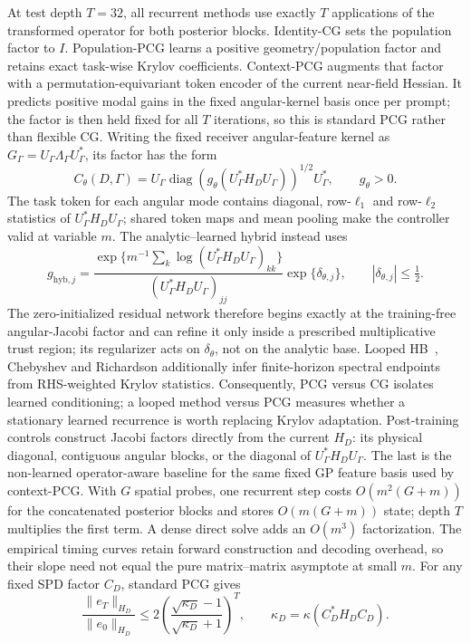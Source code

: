 \documentclass[10pt]{article}
\begin{document}
At test depth $T=32$, all recurrent methods use exactly
$T$ applications of the transformed operator for both posterior blocks.
Identity-CG sets the population factor to $I$.  Population-PCG learns a positive
geometry/population factor and retains exact task-wise Krylov coefficients.
Context-PCG augments that factor with a permutation-equivariant token encoder
of the current near-field Hessian.  It predicts positive modal gains in the
fixed angular-kernel basis once per prompt; the factor is then held fixed for
all $T$ iterations, so this is standard PCG rather than flexible CG.  Writing
the fixed receiver angular-feature kernel as
$G_\Gamma=U_\Gamma\Lambda_\Gamma U_\Gamma^*$, its factor has the form
\[
 C_\theta(D,\Gamma)=U_\Gamma
 \operatorname{diag}\!\left(g_\theta(
 U_\Gamma^*H_DU_\Gamma)\right)^{1/2}U_\Gamma^*,
 \qquad g_\theta>0.
\]
The task token for each angular mode contains diagonal, row-$\ell_1$ and
row-$\ell_2$ statistics of $U_\Gamma^*H_DU_\Gamma$; shared token maps and mean
pooling make the controller valid at variable $m$.
The analytic--learned hybrid instead uses
\[
 g_{\mathrm{hyb},j}=\frac{
 \exp\{m^{-1}\sum_k\log (U_\Gamma^*H_DU_\Gamma)_{kk}\}
 }{(U_\Gamma^*H_DU_\Gamma)_{jj}}
 \exp\{\delta_{\theta,j}\},\qquad |\delta_{\theta,j}|\leq\tfrac12 .
\]
The zero-initialized residual network therefore begins exactly at the
training-free angular-Jacobi factor and can refine it only inside a prescribed
multiplicative trust region; its regularizer acts on $\delta_\theta$, not on the
analytic base.
Looped HB~\cite{polyak1964}, Chebyshev and Richardson additionally infer
finite-horizon spectral
endpoints from RHS-weighted Krylov statistics.  Consequently, PCG versus CG
isolates learned conditioning; a looped method versus PCG measures whether a
stationary learned recurrence is worth replacing Krylov adaptation.
Post-training controls construct Jacobi factors directly from the current
$H_D$: its physical diagonal, contiguous angular blocks, or the diagonal of
$U_\Gamma^*H_DU_\Gamma$.  The last is the non-learned operator-aware baseline
for the same fixed GP feature basis used by context-PCG.
With $G$ spatial probes, one recurrent step costs
$O(m^2(G+m))$ for the concatenated posterior blocks and stores
$O(m(G+m))$ state; depth $T$ multiplies the first term.  A dense direct solve
adds an $O(m^3)$ factorization.  The empirical timing curves retain forward
construction and decoding overhead, so their slope need not equal the pure
matrix--matrix asymptote at small $m$.
For any fixed SPD factor $C_D$, standard PCG gives~\cite{saad2003}
\[
 \frac{\|e_T\|_{H_D}}{\|e_0\|_{H_D}}
 \leq 2\left(
 \frac{\sqrt{\kappa_D}-1}{\sqrt{\kappa_D}+1}
 \right)^T,
 \qquad \kappa_D=\kappa(C_D^*H_DC_D).
\]
\end{document}

